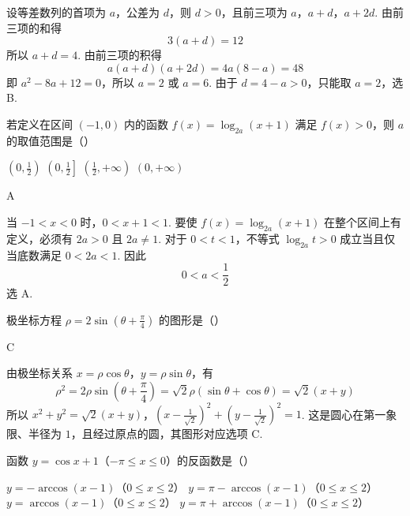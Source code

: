 \begin{solution}
设等差数列的首项为 \(a\)，公差为 \(d\)，则 \(d>0\)，且前三项为 \(a\)，\(a+d\)，\(a+2d\). 由前三项的和得
\[
3(a+d)=12
\]
所以 \(a+d=4\). 由前三项的积得
\[
a(a+d)(a+2d)=4a(8-a)=48
\]
即 \(a^2-8a+12=0\)，所以 \(a=2\) 或 \(a=6\). 由于 \(d=4-a>0\)，只能取 \(a=2\)，选 B.
\end{solution}

\begin{problem}
若定义在区间 \((-1,0)\) 内的函数 \(f(x) = \log_{2a}(x + 1)\) 满足 \(f(x) > 0\)，则 \(a\) 的取值范围是（\quad）

\choices
    {\(\left(0, \frac{1}{2}\right)\)}
    {\(\left(0, \frac{1}{2}\right]\)}
    {\(\left(\frac{1}{2}, +\infty\right)\)}
    {\((0, +\infty)\)}
\end{problem}

\begin{answer}
A
\end{answer}

\begin{solution}
当 \(-1<x<0\) 时，\(0<x+1<1\). 要使 \(f(x)=\log_{2a}(x+1)\) 在整个区间上有定义，必须有 \(2a>0\) 且 \(2a\ne1\). 对于 \(0<t<1\)，不等式 \(\log_{2a}t>0\) 成立当且仅当底数满足 \(0<2a<1\). 因此
\[
0<a<\frac12
\]
选 A.
\end{solution}

\begin{problem}
极坐标方程 \(\rho = 2\sin \left(\theta + \frac{\pi}{4}\right)\) 的图形是（\quad）

    {}
    {}
    {}
\end{problem}

\begin{answer}
C
\end{answer}

\begin{solution}
由极坐标关系 \(x=\rho\cos\theta\)，\(y=\rho\sin\theta\)，有
\[
\rho^2=2\rho\sin\left(\theta+\frac\pi4\right)=\sqrt2\rho(\sin\theta+\cos\theta)=\sqrt2(x+y)
\]
所以
\(x^2+y^2=\sqrt2(x+y)\)，\(\left(x-\frac1{\sqrt2}\right)^2+\left(y-\frac1{\sqrt2}\right)^2=1\).
这是圆心在第一象限、半径为 \(1\)，且经过原点的圆，其图形对应选项 C.
\end{solution}

\begin{problem}
函数 \( y = \cos x + 1 \)（\(-\pi \leqslant x \leqslant 0\)）的反函数是（\quad）

\choices
    {\(y = -\arccos (x - 1)\)（\(0\leqslant x\leqslant 2\)）}
    {\(y = \pi -\arccos (x - 1)\)（\(0\leqslant x\leqslant 2\)）}
    {\(y = \arccos (x - 1)\)（\(0\leqslant x\leqslant 2\)）}
    {\(y = \pi +\arccos (x - 1)\)（\(0\leqslant x\leqslant 2\)）}
\end{problem}

